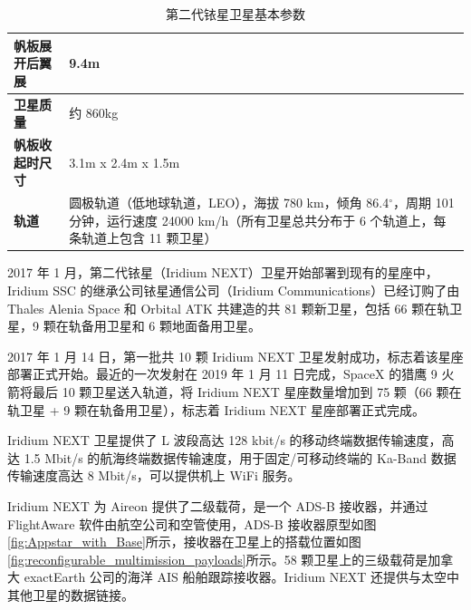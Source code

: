 \begin{itemize}
    \renewcommand\arraystretch{1.5}
    \begin{table}[!htb]
    \centering
    \caption{第二代铱星卫星基本参数}
    \label{tab:iridium_next_paras}
    \begin{tabular}[b]{|p{4cm}<{\raggedleft}|p{8cm}<{\raggedright}|}
    \hline
    \textbf{帆板展开后翼展} & 9.4m \\
    \hline
    \textbf{卫星质量} & 约 860kg\\
    \hline
    \textbf{帆板收起时尺寸}& 3.1m x 2.4m x 1.5m \\
    \hline
    \textbf{轨道} & 圆极轨道（低地球轨道，LEO），海拔 780 km，倾角 86.4$^\circ$，周期 101 分钟，运行速度 24000 km/h（所有卫星总共分布于 6 个轨道上，每条轨道上包含 11 颗卫星）\\
    \hline
    \end{tabular}
    \end{table}

    2017 年 1 月，第二代铱星（Iridium NEXT）卫星开始部署到现有的星座中，Iridium SSC 的继承公司铱星通信公司（Iridium Communications）已经订购了由 Thales Alenia Space 和 Orbital ATK 共建造的共 81 颗新卫星，包括 66 颗在轨卫星，9 颗在轨备用卫星和 6 颗地面备用卫星。

    2017 年 1 月 14 日，第一批共 10 颗 Iridium NEXT 卫星发射成功，标志着该星座部署正式开始。最近的一次发射在 2019 年 1 月 11 日完成，SpaceX 的猎鹰 9 火箭将最后 10 颗卫星送入轨道，将 Iridium NEXT 星座数量增加到 75 颗（66 颗在轨卫星 + 9 颗在轨备用卫星），标志着 Iridium NEXT 星座部署正式完成。

    Iridium NEXT 卫星提供了 L 波段高达 128 kbit/s 的移动终端数据传输速度，高达 1.5 Mbit/s 的航海终端数据传输速度，用于固定/可移动终端的 Ka-Band 数据传输速度高达 8 Mbit/s，可以提供机上 WiFi 服务。

    Iridium NEXT 为 Aireon 提供了二级载荷，是一个 ADS-B 接收器，并通过 FlightAware 软件由航空公司和空管使用，ADS-B 接收器原型如图\ref{fig:Appstar_with_Base}所示，接收器在卫星上的搭载位置如图\ref{fig:reconfigurable_multimission_payloads}所示。58 颗卫星上的三级载荷是加拿大 exactEarth 公司的海洋 \acs{AIS} 船舶跟踪接收器。Iridium NEXT 还提供与太空中其他卫星的数据链接。


\end{itemize}
